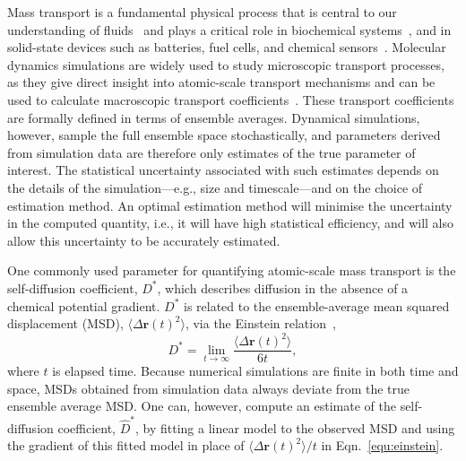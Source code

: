 \documentclass[reprint,superscriptaddress,nobibnotes,amsmath,amssymb,aps,prx,hidelinks]{revtex4-2}
\newcommand{\MSD}[1]{\big\langle\Delta\mathbf{r}{(#1)}^2\big\rangle}
\newcommand{\Dest}{\ensuremath{\widehat{D}^*}}
\newcommand{\D}{\ensuremath{D^*}}
\begin{document}
Mass transport is a fundamental physical process that is central to our understanding of fluids~\cite{sendner_interfacial_2009,shimizu_structural_2015,ghoufi_ultrafast_2016} and plays a critical role in biochemical systems~\cite{maccmmon_dynamics_1977,robertson_diffusion_2006}, and in solid-state devices such as batteries, fuel cells, and chemical sensors~\cite{eames_ionic_2015,morgan_understanding_2011,walsh_taking_2018}.
Molecular dynamics simulations are widely used to study microscopic transport processes, as they give direct insight into atomic-scale transport mechanisms and can be used to calculate macroscopic transport coefficients~\cite{morgan_relationships_2014,morgan_mechanistic_2021,poletayev_defect_2022,klepis_long_2009,wang_application_2011,zelovich_hydroxide_2019}.
These transport coefficients are formally defined in terms of ensemble averages.
Dynamical simulations, however, sample the full ensemble space stochastically, and parameters derived from simulation data are therefore only estimates of the true parameter of interest.
The statistical uncertainty associated with such estimates depends on the details of the simulation---e.g., size and timescale---and on the choice of estimation method.
An optimal estimation method will minimise the uncertainty in the computed quantity, i.e., it will have high statistical efficiency, and will also allow this uncertainty to be accurately estimated.

One commonly used parameter for quantifying atomic-scale mass transport is the self-diffusion coefficient, $\D$, which describes diffusion in the absence of a chemical potential gradient.
$\D$ is related to the ensemble-average mean squared displacement (MSD), $\MSD{t}$, via the Einstein relation~\cite{einstein_uber_1905,helfand_transport_1960},
%
\begin{equation}
    \D = \lim_{t\to\infty}\frac{\MSD{t}}{6t},
    \label{equ:einstein}
\end{equation}
%
where $t$ is elapsed time.
Because numerical simulations are finite in both time and space, MSDs obtained from simulation data always deviate from the true ensemble average MSD.
One can, however, compute an estimate of the self-diffusion coefficient, $\Dest$, by fitting a linear model to the observed MSD and using the gradient of this fitted model in place of $\MSD{t} / t$ in Eqn.~\ref{equ:einstein}.
\end{document}
